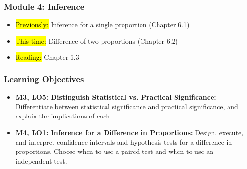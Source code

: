 
\begin{frame}
    \frametitle{Module 4: Inference}
    \begin{itemize}
        \item \hl{Previously: }Inference for a single proportion (Chapter 6.1)
        \item \hl{This time: }Difference of two proportions (Chapter 6.2)
        \item \hl{Reading: }Chapter 6.3
    \end{itemize}

\end{frame}
\begin{frame}
    \frametitle{Learning Objectives}
    \begin{itemize}
        \item \textbf{M3, LO5: Distinguish Statistical vs. Practical Significance:} Differentiate between statistical significance and practical significance, and explain the implications of each.
        \item \textbf{M4, LO1: Inference for a Difference in Proportions:} Design, execute, and interpret confidence intervals and hypothesis tests for a difference in proportions. Choose when to use a paired test and when to use an independent test.
    \end{itemize}
\end{frame}
